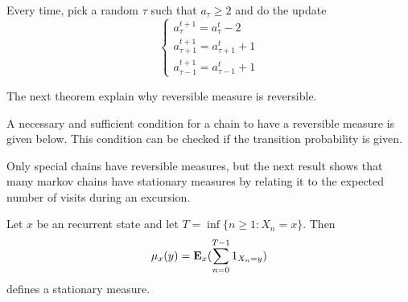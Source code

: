 \begin{example}
    Every time, pick a random $\tau$ such that $a_\tau\geq 2$ and do the update 
    \[\left\{\begin{matrix}
        a_\tau^{t+1} = a_\tau^{t} -2 \\
        a_{\tau+1}^{t+1}= a_{\tau+1}^{t}+1  \\
        a_{\tau-1}^{t+1}= a_{\tau-1}^{t}+1
        \end{matrix}\right.\]
\end{example}

The next theorem explain why reversible measure is reversible.
\begin{theorem}
    
\end{theorem}

A necessary and sufficient condition for a chain to have a reversible measure is given below. This condition can be checked if the transition probability is given.
\begin{theorem}
    
\end{theorem}
Only special chains have reversible measures, but the next result shows that many markov chains have stationary measures by relating it to the expected number of visits during an excursion.
\begin{theorem}\label{stationary measure and expected number of visit}
    Let $x$ be an recurrent state and let $T=\inf\{n\geq 1:X_n=x\}$. Then 
    \[\mu_x(y)=\mathbf{E}_x(\sum_{n=0}^{T-1}1_{X_n=y}) \] 
    defines a stationary measure.
\end{theorem}

